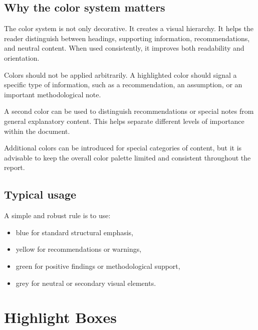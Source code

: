 \documentclass[11pt,a4paper]{report}
\begin{document}
\section{Why the color system matters}

The color system is not only decorative. It creates a visual hierarchy. It helps the reader distinguish between headings, supporting information, recommendations, and neutral content. When used consistently, it improves both readability and orientation.

\begin{coloredBlock}[blue]{}
Colors should not be applied arbitrarily. A highlighted color should signal a specific type of information, such as a recommendation, an assumption, or an important methodological note.
\end{coloredBlock}

\begin{coloredBlock}[yellow]{}
A second color can be used to distinguish recommendations or special notes from general explanatory content. This helps separate different levels of importance within the document.
\end{coloredBlock}

\begin{coloredBlock}[green]{}
Additional colors can be introduced for special categories of content, but it is advisable to keep the overall color palette limited and consistent throughout the report.
\end{coloredBlock}

\section{Typical usage}

A simple and robust rule is to use:
\begin{itemize}
    \item blue for standard structural emphasis,
    \item yellow for recommendations or warnings,
    \item green for positive findings or methodological support,
    \item grey for neutral or secondary visual elements.
\end{itemize}

\clearpage


\chapter{Highlight Boxes}
\end{document}
